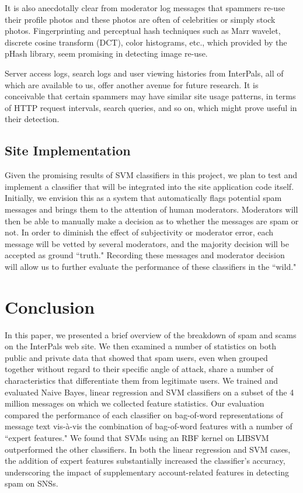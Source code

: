 \documentclass[preprint]{acm_proc_article-sp}
\begin{document}
It is also anecdotally clear from moderator log messages that spammers re-use their profile photos and 
these photos are often of celebrities or simply stock photos. Fingerprinting and perceptual hash techniques 
such as Marr wavelet, discrete cosine transform (DCT), color histograms, etc., which provided by the 
pHash library\cite{phash}, seem promising in detecting image re-use. 

Server access logs, search logs and user viewing histories from InterPals, all of which 
are available to us, offer another avenue for future research. It is conceivable that certain 
spammers may have similar site usage patterns, in terms of HTTP request intervals, search queries, 
and so on, which might prove useful in their detection.

\subsection{Site Implementation}

Given the promising results of SVM classifiers in this project, we plan to test and implement a classifier that will 
be integrated into the site application code itself. Initially, we envision this as a system that automatically flags 
potential spam messages and brings them to the attention of human moderators. Moderators will then be able to manually 
make a decision as to whether the messages are spam or not. In order to diminish the effect of subjectivity or moderator 
error, each message will be vetted by several moderators, and the majority decision will be accepted as ground ``truth." 
Recording these messages and moderator decision will allow us to further evaluate the performance of these classifiers in 
the ``wild."

\section{Conclusion}

In this paper, we presented a brief overview of the breakdown of spam and scams on the InterPals web site. 
We then examined a number of statistics on both public and private data that showed that spam users, even when 
grouped together without regard to their specific angle of attack, share a number of characteristics that differentiate 
them from legitimate users. We trained and evaluated Naive Bayes, linear regression and SVM classifiers on a subset 
of the 4 million messages on which we collected feature statistics. Our evaluation compared the performance of 
each classifier on bag-of-word representations of message text vis-\`{a}-vis the combination of bag-of-word features 
with a number of ``expert features." We found that SVMs using an RBF kernel on LIBSVM outperformed the other 
classifiers. In both the linear regression and SVM cases, the addition of expert features substantially increased 
the classifier's accuracy, underscoring the impact of supplementary account-related features in detecting spam on 
SNSs.




\balancecolumns
\end{document}
